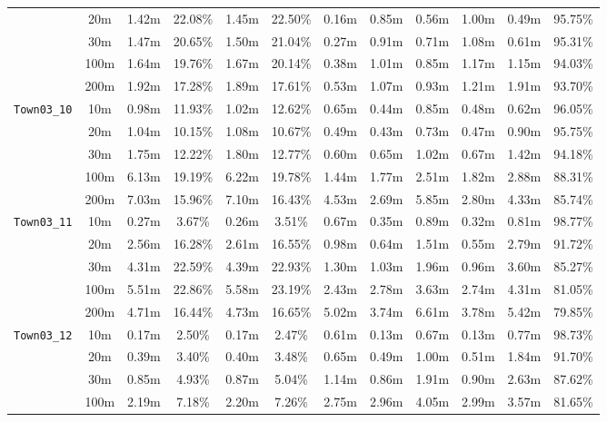 \begin{table}
{\begin{tabular}{@{}cccccccccccc@{}}
      & 20m & 1.42m & 22.08\% & 1.45m & 22.50\% & 0.16m & 0.85m & 0.56m & 1.00m & 0.49m & 95.75\% \\
      & 30m & 1.47m & 20.65\% & 1.50m & 21.04\% & 0.27m & 0.91m & 0.71m & 1.08m & 0.61m & 95.31\% \\
      & 100m & 1.64m & 19.76\% & 1.67m & 20.14\% & 0.38m & 1.01m & 0.85m & 1.17m & 1.15m & 94.03\% \\
      & 200m & 1.92m & 17.28\% & 1.89m & 17.61\% & 0.53m & 1.07m & 0.93m & 1.21m & 1.91m & 93.70\% \\
      \midrule
      \multirow{5}{*}{\Verb|Town03_10|} & 10m & 0.98m & 11.93\% & 1.02m & 12.62\% & 0.65m & 0.44m & 0.85m & 0.48m & 0.62m & 96.05\% \\
      & 20m & 1.04m & 10.15\% & 1.08m & 10.67\% & 0.49m & 0.43m & 0.73m & 0.47m & 0.90m & 95.75\% \\
      & 30m & 1.75m & 12.22\% & 1.80m & 12.77\% & 0.60m & 0.65m & 1.02m & 0.67m & 1.42m & 94.18\% \\
      & 100m & 6.13m & 19.19\% & 6.22m & 19.78\% & 1.44m & 1.77m & 2.51m & 1.82m & 2.88m & 88.31\% \\
      & 200m & 7.03m & 15.96\% & 7.10m & 16.43\% & 4.53m & 2.69m & 5.85m & 2.80m & 4.33m & 85.74\% \\
      \midrule
      \multirow{5}{*}{\Verb|Town03_11|} & 10m & 0.27m & 3.67\% & 0.26m & 3.51\% & 0.67m & 0.35m & 0.89m & 0.32m & 0.81m & 98.77\% \\
      & 20m & 2.56m & 16.28\% & 2.61m & 16.55\% & 0.98m & 0.64m & 1.51m & 0.55m & 2.79m & 91.72\% \\
      & 30m & 4.31m & 22.59\% & 4.39m & 22.93\% & 1.30m & 1.03m & 1.96m & 0.96m & 3.60m & 85.27\% \\
      & 100m & 5.51m & 22.86\% & 5.58m & 23.19\% & 2.43m & 2.78m & 3.63m & 2.74m & 4.31m & 81.05\% \\
      & 200m & 4.71m & 16.44\% & 4.73m & 16.65\% & 5.02m & 3.74m & 6.61m & 3.78m & 5.42m & 79.85\% \\
      \midrule
      \multirow{5}{*}{\Verb|Town03_12|} & 10m & 0.17m & 2.50\% & 0.17m & 2.47\% & 0.61m & 0.13m & 0.67m & 0.13m & 0.77m & 98.73\% \\
      & 20m & 0.39m & 3.40\% & 0.40m & 3.48\% & 0.65m & 0.49m & 1.00m & 0.51m & 1.84m & 91.70\% \\
      & 30m & 0.85m & 4.93\% & 0.87m & 5.04\% & 1.14m & 0.86m & 1.91m & 0.90m & 2.63m & 87.62\% \\
      & 100m & 2.19m & 7.18\% & 2.20m & 7.26\% & 2.75m & 2.96m & 4.05m & 2.99m & 3.57m & 81.65\% \\

\end{tabular}}
\end{table}
